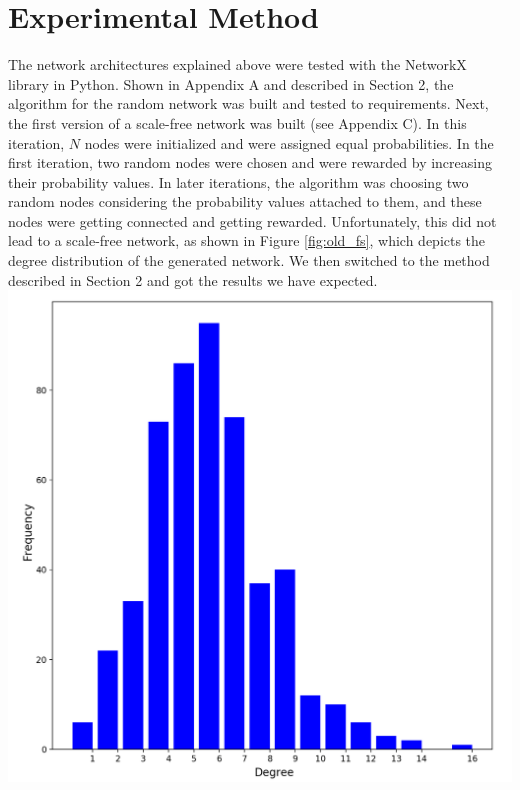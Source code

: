 \documentclass[journal]{IEEEtran}
\begin{document}
\section{Experimental Method}
\noindent The network architectures explained above were tested with the NetworkX library in Python. Shown in Appendix A and described in Section 2, the algorithm for the random network was built and tested to requirements. Next, the first version of a scale-free network was built (see Appendix C). In this iteration, $N$ nodes were initialized and were assigned equal probabilities. In the first iteration, two random nodes were chosen and were rewarded by increasing their probability values. In later iterations, the algorithm was choosing two random nodes considering the probability values attached to them, and these nodes were getting connected and getting rewarded. Unfortunately, this did not lead to a scale-free network, as shown in Figure \ref{fig:old_fs}, which depicts the degree distribution of the generated network. We then switched to the method described in Section 2 and got the results we have expected.\\

\begingroup
    \centering
    \medskip
    \includegraphics[width=\columnwidth]{images/old_fs.png}
    \label{fig:old_fs}
    \medskip
\endgroup
\medskip
\end{document}
